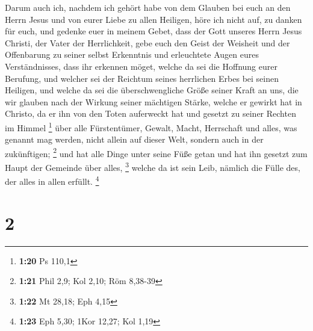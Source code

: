  Darum auch ich, nachdem ich gehört habe von dem Glauben
bei euch an den Herrn Jesus und von eurer Liebe zu allen Heiligen,
 höre ich nicht auf, zu danken für euch, und gedenke euer
in meinem Gebet,  dass der Gott unseres Herrn Jesus
Christi, der Vater der Herrlichkeit, gebe euch den Geist der Weisheit
und der Offenbarung zu seiner selbst Erkenntnis  und
erleuchtete Augen eures Verständnisses, dass ihr erkennen möget, welche
da sei die Hoffnung eurer Berufung, und welcher sei der Reichtum seines
herrlichen Erbes bei seinen Heiligen,  und welche da sei
die überschwengliche Größe seiner Kraft an uns, die wir glauben nach der
Wirkung seiner mächtigen Stärke,  welche er gewirkt hat in
Christo, da er ihn von den Toten auferweckt hat und gesetzt zu seiner
Rechten im Himmel \footnote{\textbf{1:20} Ps 110,1}  über
alle Fürstentümer, Gewalt, Macht, Herrschaft und alles, was genannt mag
werden, nicht allein auf dieser Welt, sondern auch in der zukünftigen;
\footnote{\textbf{1:21} Phil 2,9; Kol 2,10; Röm 8,38-39} 
und hat alle Dinge unter seine Füße getan und hat ihn gesetzt zum Haupt
der Gemeinde über alles, \footnote{\textbf{1:22} Mt 28,18; Eph 4,15}
 welche da ist sein Leib, nämlich die Fülle des, der alles
in allen erfüllt. \footnote{\textbf{1:23} Eph 5,30; 1Kor 12,27; Kol 1,19}

\hypertarget{section-1}{%
\section{2}\label{section-1}}

